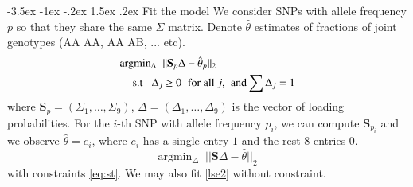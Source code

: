 \documentclass[portrait]{a0poster}
\makeatletter
\def\S{\mathbf{S}}
\def\min{\mbox{min}}
\renewcommand\subsection{\@startsection {subsection}{2}{\z@}%
                                   {-3.5ex \@plus -1ex \@minus -.2ex}%
                                   {1.5ex \@plus.2ex}%
                                   {\large\bfseries\sc\color{mygreen}}}
\makeatother
\begin{document}
\begin{multicols}{3}
\subsection{Fit the model}
We consider SNPs with allele frequency $p$ so that they share the same $\Sigma$ matrix.  Denote $\hat\theta$ estimates of fractions of joint genotypes (AA AA, AA AB, ... etc).   
\begin{subequations} \label{lse}
\begin{align}
{\text{arg} \min_\Delta\;\;}  &||\S_p \Delta - \hat\theta_p ||_2  \label{eq:lse} \\
       \mbox{s.t \;\;} \Delta_j & \ge 0  \mbox{\;\;for all $j$, \;and} \sum \Delta_j  = 1 \label{eq:st}
\end{align}
\end{subequations}
where $\S_p = (\Sigma_1, \dots, \Sigma_9)$, $\Delta=(\Delta_1, \dots, \Delta_9)$ is the vector of loading probabilities. 
%
For the $i$-th SNP with allele frequency $p_i$, we can compute $\S_{p_i}$ and we observe $\hat{\theta}=e_i$, where $e_i$ has a single entry $1$ and the rest $8$ entries $0$.  %
\begin{equation} \label{lse2}
{\text{arg} \min_\Delta\;\;}  ||\S \Delta - \hat\theta ||_2  %
\end{equation}
with constraints \eqref{eq:st}. We may also fit \eqref{lse2} without constraint. 



\end{multicols}
\end{document}
